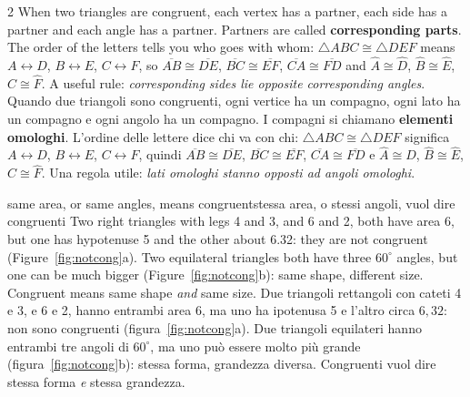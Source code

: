\documentclass[10pt,a4paper,oneside]{book}
\newif\ifIT
\newenvironment{bi}%
  {\begin{paracol}{2}\global\ITfalse\selectlanguage{english}}%
  {\end{paracol}}
\newcommand{\IT}{\switchcolumn\global\ITtrue\selectlanguage{italian}}
\newcommand{\av}[1]{\widehat{#1}}           %
\newcommand{\seg}[1]{\overline{#1}}         %
\newcommand{\tri}[1]{\triangle #1}          %
\begin{document}
\begin{bi}
When two triangles are congruent, each vertex has a partner, each side has a partner and each angle has a partner. Partners are called \textbf{corresponding parts}. The order of the letters tells you who goes with whom: $\tri{ABC} \cong \tri{DEF}$ means $A \leftrightarrow D$, $B \leftrightarrow E$, $C \leftrightarrow F$, so $\seg{AB} \cong \seg{DE}$, $\seg{BC} \cong \seg{EF}$, $\seg{CA} \cong \seg{FD}$ and $\av{A} \cong \av{D}$, $\av{B} \cong \av{E}$, $\av{C} \cong \av{F}$. A useful rule: \emph{corresponding sides lie opposite corresponding angles}.
\IT
Quando due triangoli sono congruenti, ogni vertice ha un compagno, ogni lato ha un compagno e ogni angolo ha un compagno. I compagni si chiamano \textbf{elementi omologhi}. L'ordine delle lettere dice chi va con chi: $\tri{ABC} \cong \tri{DEF}$ significa $A \leftrightarrow D$, $B \leftrightarrow E$, $C \leftrightarrow F$, quindi $\seg{AB} \cong \seg{DE}$, $\seg{BC} \cong \seg{EF}$, $\seg{CA} \cong \seg{FD}$ e $\av{A} \cong \av{D}$, $\av{B} \cong \av{E}$, $\av{C} \cong \av{F}$. Una regola utile: \emph{lati omologhi stanno opposti ad angoli omologhi}.
\end{bi}

\begin{trap}{same area, or same angles, means congruent}{stessa area, o stessi angoli, vuol dire congruenti}
Two right triangles with legs 4 and 3, and 6 and 2, both have area 6, but one has hypotenuse 5 and the other about 6.32: they are not congruent (Figure~\ref{fig:notcong}a). Two equilateral triangles both have three $60^\circ$ angles, but one can be much bigger (Figure~\ref{fig:notcong}b): same shape, different size. Congruent means same shape \emph{and} same size.
\tcblower
Due triangoli rettangoli con cateti 4 e 3, e 6 e 2, hanno entrambi area 6, ma uno ha ipotenusa 5 e l'altro circa $6{,}32$: non sono congruenti (figura~\ref{fig:notcong}a). Due triangoli equilateri hanno entrambi tre angoli di $60^\circ$, ma uno può essere molto più grande (figura~\ref{fig:notcong}b): stessa forma, grandezza diversa. Congruenti vuol dire stessa forma \emph{e} stessa grandezza.
\end{trap}
\end{document}
